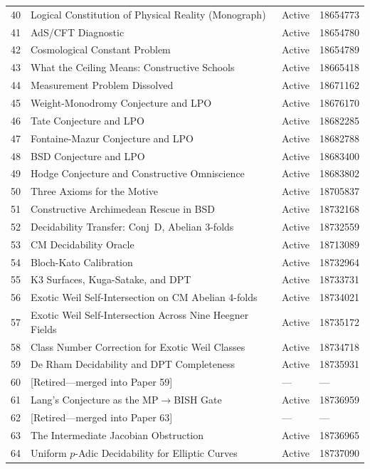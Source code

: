 \documentclass[11pt,twoside,openany]{report}
\theoremstyle{remark}
\newcommand{\BISH}{\textsf{BISH}}
\begin{document}
\begin{longtable}{@{}r p{7.5cm} l l@{}}
 40 & Logical Constitution of Physical Reality (Monograph) & Active & 18654773 \\
 41 & AdS/CFT Diagnostic & Active & 18654780 \\
 42 & Cosmological Constant Problem & Active & 18654789 \\
 43 & What the Ceiling Means: Constructive Schools & Active & 18665418 \\
 44 & Measurement Problem Dissolved & Active & 18671162 \\
\midrule
 45 & Weight-Monodromy Conjecture and LPO & Active & 18676170 \\
 46 & Tate Conjecture and LPO & Active & 18682285 \\
 47 & Fontaine-Mazur Conjecture and LPO & Active & 18682788 \\
 48 & BSD Conjecture and LPO & Active & 18683400 \\
 49 & Hodge Conjecture and Constructive Omniscience & Active & 18683802 \\
 50 & Three Axioms for the Motive & Active & 18705837 \\
 51 & Constructive Archimedean Rescue in BSD & Active & 18732168 \\
 52 & Decidability Transfer: Conj~D, Abelian 3-folds & Active & 18732559 \\
 53 & CM Decidability Oracle & Active & 18713089 \\
 54 & Bloch-Kato Calibration & Active & 18732964 \\
 55 & K3 Surfaces, Kuga-Satake, and DPT & Active & 18733731 \\
 56 & Exotic Weil Self-Intersection on CM Abelian 4-folds & Active & 18734021 \\
 57 & Exotic Weil Self-Intersection Across Nine Heegner Fields & Active & 18735172 \\
 58 & Class Number Correction for Exotic Weil Classes & Active & 18734718 \\
 59 & De Rham Decidability and DPT Completeness & Active & 18735931 \\
 60 & [Retired---merged into Paper 59] & --- & --- \\
 61 & Lang's Conjecture as the MP$\to$\BISH{} Gate & Active & 18736959 \\
 62 & [Retired---merged into Paper 63] & --- & --- \\
 63 & The Intermediate Jacobian Obstruction & Active & 18736965 \\
 64 & Uniform $p$-Adic Decidability for Elliptic Curves & Active & 18737090 \\

\end{longtable}
\end{document}
